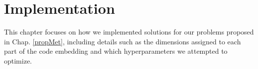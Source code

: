 
\chapter{Implementation} \label{chap:implementation}

This chapter focuses on how we implemented solutions for our problems proposed in Chap. \ref{propMet}, including details such as the dimensions assigned to each part of the code embedding and which hyperparameters we attempted to optimize.





